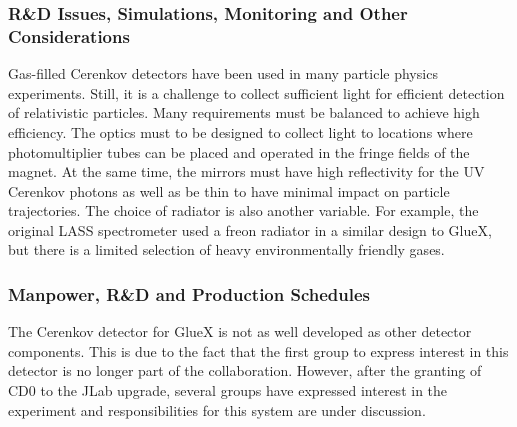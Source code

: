\subsubsection*{R\&D Issues, Simulations, Monitoring and Other Considerations}

Gas-filled Cerenkov detectors have been used in many particle physics 
experiments. Still, it is a challenge to collect
sufficient light for efficient detection of relativistic
particles. Many requirements must be balanced to achieve high efficiency.
The optics must to be designed to collect light to locations
where photomultiplier tubes can be placed and operated in the fringe
fields of the magnet. At the same time, the mirrors must have high reflectivity for the UV Cerenkov
photons as well as be thin to have minimal impact on particle trajectories.
The choice of radiator is also another variable. For example, the 
original LASS spectrometer used a freon radiator in a 
similar design to GlueX, but there is a limited selection of heavy
environmentally friendly gases. 

\subsubsection*{Manpower, R\&D and Production Schedules}

The Cerenkov detector for GlueX is not as well developed as other detector components.
This is due to the fact that the first group to express interest in this detector
is no longer part of the collaboration. 
However, after the granting of CD0 to the JLab upgrade,
several groups have expressed interest in the experiment and responsibilities
for this system are under discussion.
